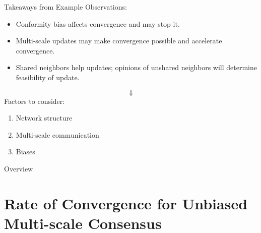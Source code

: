\documentclass[usenames,dvipsnames,10pt]{beamer}
\theoremstyle{remark}
\begin{document}


\begin{frame}{Takeaways from Example}
	Observations:
	\begin{itemize}
		\item Conformity bias affects convergence and may stop it.
		\item Multi-scale updates may make convergence possible and accelerate convergence.
		\item Shared neighbors help updates; opinions of unshared neighbors will determine feasibility of update.
	\end{itemize}
	\pause
	$$
\Downarrow
	$$
	\pause
	Factors to consider:
	\begin{enumerate}
		\item Network structure
		\item Multi-scale communication
		\item Biases
	\end{enumerate}
\end{frame}

\begin{frame}{Overview}
\tableofcontents
\end{frame}

\section{Rate of Convergence for Unbiased Multi-scale Consensus}
\end{document}
